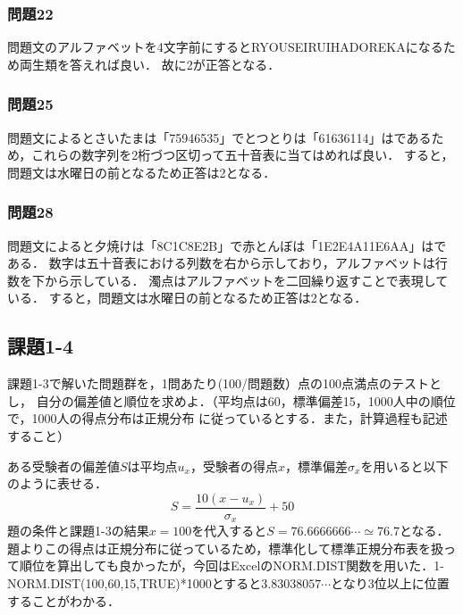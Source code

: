 \documentclass[12pt]{jarticle}
\begin{document}
\subsubsection{問題22}
問題文のアルファベットを4文字前にするとRYOUSEIRUIHADOREKAになるため両生類を答えれば良い．
故に2が正答となる．
\subsubsection{問題25}
問題文によるとさいたまは「75946535」でとつとりは「61636114」はであるため，これらの数字列を2桁づつ区切って五十音表に当てはめれば良い．
すると，問題文は水曜日の前となるため正答は2となる．
\subsubsection{問題28}
問題文によると夕焼けは「8C1C8E2B」で赤とんぼは「1E2E4A11E6AA」はである．
数字は五十音表における列数を右から示しており，アルファベットは行数を下から示している．
濁点はアルファベットを二回繰り返すことで表現している．
すると，問題文は水曜日の前となるため正答は2となる．
\subsection{課題1-4}
\begin{shadebox}
    \quad
    課題1-3で解いた問題群を，1問あたり(100/問題数）点の100点満点のテストとし，
    自分の偏差値と順位を求めよ．（平均点は60，標準偏差15，1000人中の順位で，1000人の得点分布は正規分布
    に従っているとする．また，計算過程も記述すること）
\end{shadebox}
\vspace{\baselineskip}
ある受験者の偏差値$S$は平均点$u_x$，受験者の得点$x$，標準偏差$\sigma_x$を用いると以下のように表せる．
\begin{equation}
    S = \frac{10(x-u_x)}{\sigma_x}+50
\end{equation}
題の条件と課題1-3の結果$x=100$を代入すると$S=76.6666666\cdots\simeq76.7$となる．
題よりこの得点は正規分布に従っているため，標準化して標準正規分布表を扱って順位を算出しても良かったが，今回はExcelのNORM.DIST関数を用いた．1-NORM.DIST(100,60,15,TRUE)*1000とすると$3.83038057\cdots$となり3位以上に位置することがわかる．
\end{document}
